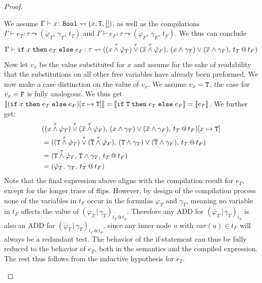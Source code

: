 \begin{proof}
\begin{itemize}
		We assume $\Gamma \vdash x \colon \texttt{Bool} \leadsto (x, \texttt{T}, [])$, as well as the compilations $\Gamma \vdash e_T \colon \tau \leadsto (\dot{\varphi}_T,\, \gamma_T,\, t_T)$ and $\Gamma \vdash e_F \colon \tau \leadsto (\dot{\varphi}_F,\, \gamma_F,\, t_F)$.
		We thus can conclude 
		$$\Gamma \vdash \textnormal{\texttt{if}}\;{x}\;\texttt{then}\; e_T \; \textnormal{\texttt{else}}\; e_F  \colon \tau \leadsto ( 
		(x \overset{\tau}{\land} \dot{\varphi}_T) \overset{\tau}{\lor} (\overline{x} \overset{\tau}{\land} \dot{\varphi}_F), \,
		(x \land \gamma_T) \lor (\overline{x}\land \gamma_F) ,\,
		t_T \,@\, t_F)$$
		Now let $v_x$ be the value substituted for $x$ and assume for the sake of readability that the substitutions on all other free variables have already been preformed.
		We now make a case distinction on the value of $v_x$.
		We assume $v_x = \texttt{T}$, the case for $v_x = \texttt{F}$ is fully analogous.
		We thus get $\llbracket ( \textnormal{\texttt{if}}\;{x}\;\texttt{then}\; e_T \; \textnormal{\texttt{else}}\; e_F )[x \mapsto \texttt{T}]\rrbracket = \llbracket  \textnormal{\texttt{if}}\;{\texttt{T}}\;\texttt{then}\; e_T \; \textnormal{\texttt{else}}\; e_F \rrbracket = \llbracket e_T\rrbracket$. We further get:
		\begin{align*}
			&( 
			(x \overset{\tau}{\land} \dot{\varphi}_T) \overset{\tau}{\lor} (\overline{x} \overset{\tau}{\land} \dot{\varphi}_F), \,
			(x \land \gamma_T) \lor (\overline{x}\land \gamma_F) ,\,
			t_T \,@\, t_F) [x \mapsto \texttt{T}] \\
			&= ( 
			(\texttt{T} \overset{\tau}{\land} \dot{\varphi}_T) \overset{\tau}{\lor} (\overline{\texttt{T}} \overset{\tau}{\land} \dot{\varphi}_F), \,
			(\texttt{T} \land \gamma_T) \lor (\overline{\texttt{T}}\land \gamma_F) ,\,
			t_T \,@\, t_F)\\
			&= ( 
			\texttt{T} \overset{\tau}{\land} \dot{\varphi}_T, \,
			\texttt{T} \land \gamma_T ,\,
			t_T \,@\, t_F)\\
			&= ( 
			\dot{\varphi}_T, \,
			\gamma_T ,\,
			t_T \,@\, t_F)
		\end{align*}
		Note that the final expression above aligns with the compilation result for $e_T$, except for the longer trace of flips. 
		However, by design of the compilation process none of the variables in $t_F$ occur in the formulas $\dot{\varphi_T}$ and $\gamma_T$, meaning no variable in $t_F$ affects the value of $(\dot{\varphi_T} \,|\, \gamma_T)_{t_T \, @ \, t_F}$.
		Therefore any ADD for $(\dot{\varphi_T} \,|\, \gamma_T)_{t_T}$ is also an ADD for $(\dot{\varphi_T} \,|\, \gamma_T)_{t_T \, @ \, t_F}$, since any inner node $u$ with $\mathit{var}(u) \in t_F$ will always be a redundant  test.
		The behavior of the if-statement can thus be fully reduced to the behavior of $e_T$, both in the semantics and the compiled expression.
		The rest thus follows from the inductive hypothesis for $e_T$.\\
		

\end{itemize}
\end{proof}
